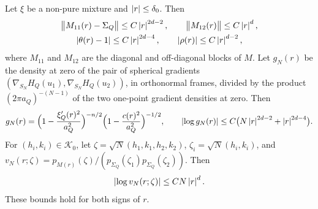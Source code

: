 \begin{lemma}\label{lem:mp-densities}
Let $\xi$ be a non-pure mixture and $\left|r\right|\le\delta_0$. Then
\begin{equation}\label{eq:mp-orders}
\begin{gathered}
\bigl\|M_{11}(r)-\Sigma_Q\bigr\|\le C\left|r\right|^{2d-2},\qquad \bigl\|M_{12}(r)\bigr\|\le C\left|r\right|^{d},\\
\left|\theta(r)-1\right|\le C\left|r\right|^{2d-4},\qquad \left|\rho(r)\right|\le C\left|r\right|^{d-2},
\end{gathered}
\end{equation}
where $M_{11}$ and $M_{12}$ are the diagonal and off-diagonal blocks of $M$. Let $g_N(r)$ be the density at zero of the pair of spherical gradients $(\nabla_{S_N}H_Q(u_1),\nabla_{S_N}H_Q(u_2))$, in orthonormal frames, divided by the product $(2\pi a_Q)^{-(N-1)}$ of the two one-point gradient densities at zero. Then
\begin{equation}\label{eq:mp-gradient-ratio}
g_N(r)=\Bigl(1-\frac{\xi_Q'(r)^2}{a_Q^2}\Bigr)^{-n/2}\Bigl(1-\frac{c(r)^2}{a_Q^2}\Bigr)^{-1/2},\qquad \left|\log g_N(r)\right|\le C\bigl(N\left|r\right|^{2d-2}+\left|r\right|^{2d-4}\bigr).
\end{equation}
For $(h_i,k_i)\in\mathcal K_0$, let $\zeta=\sqrt N(h_1,k_1,h_2,k_2)$, $\zeta_i=\sqrt N(h_i,k_i)$, and $v_N(r;\zeta)=p_{M(r)}(\zeta)/(p_{\Sigma_Q}(\zeta_1)p_{\Sigma_Q}(\zeta_2))$. Then
\begin{equation}\label{eq:mp-value-ratio}
\left|\log v_N(r;\zeta)\right|\le CN\left|r\right|^{d}.
\end{equation}
These bounds hold for both signs of $r$.
\end{lemma}

